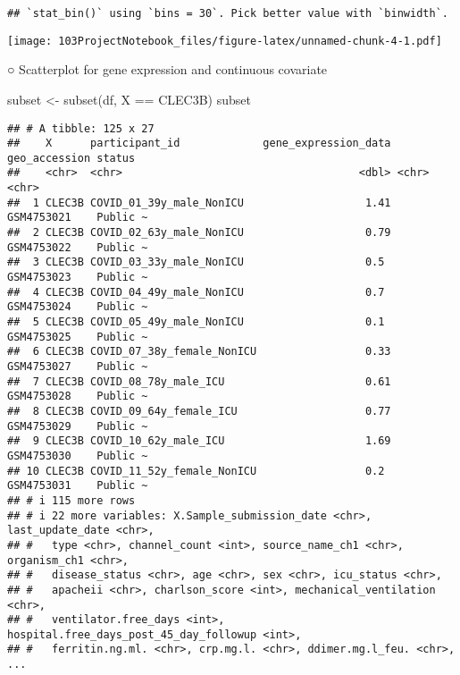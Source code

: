 \documentclass[
]{article}
\newenvironment{Shaded}{\begin{snugshade}}{\end{snugshade}}
\newcommand{\FunctionTok}[1]{\textcolor[rgb]{0.00,0.00,0.00}{#1}}
\newcommand{\NormalTok}[1]{#1}
\newcommand{\OtherTok}[1]{\textcolor[rgb]{0.56,0.35,0.01}{#1}}
\newcommand{\SpecialCharTok}[1]{\textcolor[rgb]{0.00,0.00,0.00}{#1}}
\newcommand{\StringTok}[1]{\textcolor[rgb]{0.31,0.60,0.02}{#1}}
\begin{document}
\begin{verbatim}
## `stat_bin()` using `bins = 30`. Pick better value with `binwidth`.
\end{verbatim}

\texttt{[image: 103ProjectNotebook\_files/figure-latex/unnamed-chunk-4-1.pdf]}

○ Scatterplot for gene expression and continuous covariate

\begin{Shaded}
\begin{Highlighting}[]
\NormalTok{subset }\OtherTok{\textless{}{-}} \FunctionTok{subset}\NormalTok{(df, X }\SpecialCharTok{==} \StringTok{\textquotesingle{}CLEC3B\textquotesingle{}}\NormalTok{)}
\NormalTok{subset}
\end{Highlighting}
\end{Shaded}

\begin{verbatim}
## # A tibble: 125 x 27
##    X      participant_id             gene_expression_data geo_accession status  
##    <chr>  <chr>                                     <dbl> <chr>         <chr>   
##  1 CLEC3B COVID_01_39y_male_NonICU                   1.41 GSM4753021    Public ~
##  2 CLEC3B COVID_02_63y_male_NonICU                   0.79 GSM4753022    Public ~
##  3 CLEC3B COVID_03_33y_male_NonICU                   0.5  GSM4753023    Public ~
##  4 CLEC3B COVID_04_49y_male_NonICU                   0.7  GSM4753024    Public ~
##  5 CLEC3B COVID_05_49y_male_NonICU                   0.1  GSM4753025    Public ~
##  6 CLEC3B COVID_07_38y_female_NonICU                 0.33 GSM4753027    Public ~
##  7 CLEC3B COVID_08_78y_male_ICU                      0.61 GSM4753028    Public ~
##  8 CLEC3B COVID_09_64y_female_ICU                    0.77 GSM4753029    Public ~
##  9 CLEC3B COVID_10_62y_male_ICU                      1.69 GSM4753030    Public ~
## 10 CLEC3B COVID_11_52y_female_NonICU                 0.2  GSM4753031    Public ~
## # i 115 more rows
## # i 22 more variables: X.Sample_submission_date <chr>, last_update_date <chr>,
## #   type <chr>, channel_count <int>, source_name_ch1 <chr>, organism_ch1 <chr>,
## #   disease_status <chr>, age <chr>, sex <chr>, icu_status <chr>,
## #   apacheii <chr>, charlson_score <int>, mechanical_ventilation <chr>,
## #   ventilator.free_days <int>, hospital.free_days_post_45_day_followup <int>,
## #   ferritin.ng.ml. <chr>, crp.mg.l. <chr>, ddimer.mg.l_feu. <chr>, ...
\end{verbatim}
\end{document}
